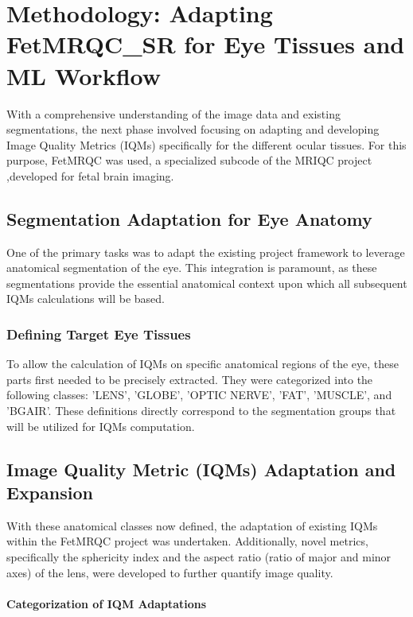 \chapter{Methodology: Adapting FetMRQC\_SR for Eye Tissues and ML Workflow}
\label{chap:methodology}

With a comprehensive understanding of the image data and existing segmentations, the next phase involved focusing on adapting and developing Image Quality Metrics (IQMs) specifically for the different ocular tissues. For this purpose, FetMRQC \cite{noauthor_medical-image-analysis-laboratoryfetmrqc_sr_nodate} was used, a specialized subcode of the MRIQC project \cite{esteban_mriqc_2017},developed for fetal brain imaging.

\section{Segmentation Adaptation for Eye Anatomy}
\label{sec:seg_adaptation}
One of the primary tasks was to adapt the existing project framework to leverage anatomical segmentation of the eye. This integration is paramount, as these segmentations provide the essential anatomical context upon which all subsequent IQMs calculations will be based.

\subsection{Defining Target Eye Tissues}
\label{ssec:target_tissues}
To allow the calculation of IQMs on specific anatomical regions of the eye, these parts first needed to be precisely extracted. They were categorized into the following classes: 'LENS', 'GLOBE', 'OPTIC NERVE', 'FAT', 'MUSCLE', and 'BGAIR'. These definitions directly correspond to the segmentation groups that will be utilized for IQMs computation.

\section{Image Quality Metric (IQMs) Adaptation and Expansion}
\label{sec:iqm_adaptation_expansion}
With these anatomical classes now defined, the adaptation of existing IQMs within the FetMRQC project was undertaken. Additionally, novel metrics, specifically the sphericity index and the aspect ratio (ratio of major and minor axes) of the lens, were developed to further quantify image quality.

\subsubsection{Categorization of IQM Adaptations}
\label{sec:iqm_categorization}

